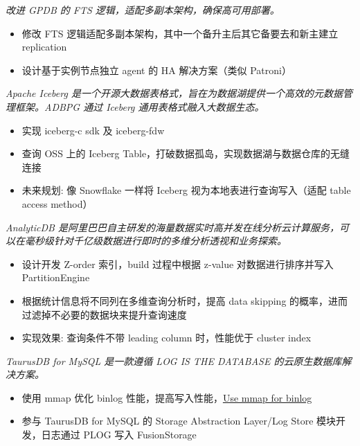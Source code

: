 \documentclass{resume}
\begin{document}
\textit{改进 GPDB 的 FTS 逻辑，适配多副本架构，确保高可用部署。}
\begin{onehalfspacing}
\begin{itemize}
  \item 修改 FTS 逻辑适配多副本架构，其中一个备升主后其它备要去和新主建立 replication
  \item 设计基于实例节点独立 agent 的 HA 解决方案（类似 Patroni）
\end{itemize}
\end{onehalfspacing}

\textit{Apache Iceberg 是一个开源大数据表格式，旨在为数据湖提供一个高效的元数据管理框架。ADBPG 通过 Iceberg 通用表格式融入大数据生态。}
\begin{onehalfspacing}
\begin{itemize}
  \item 实现 iceberg-c sdk 及 iceberg-fdw
  \item 查询 OSS 上的 Iceberg Table，打破数据孤岛，实现数据湖与数据仓库的无缝连接
  \item 未来规划: 像 Snowflake 一样将 Iceberg 视为本地表进行查询写入（适配 table access method）
\end{itemize}
\end{onehalfspacing}

\textit{AnalyticDB 是阿里巴巴自主研发的海量数据实时高并发在线分析云计算服务，可以在毫秒级针对千亿级数据进行即时的多维分析透视和业务探索。}
\begin{onehalfspacing}
\begin{itemize}
  \item 设计开发 Z-order 索引，build 过程中根据 z-value 对数据进行排序并写入 PartitionEngine
  \item 根据统计信息将不同列在多维查询分析时，提高 data skipping 的概率，进而过滤掉不必要的数据块来提升查询速度
  \item 实现效果: 查询条件不带 leading column 时，性能优于 cluster index
\end{itemize}
\end{onehalfspacing}

\textit{TaurusDB for MySQL 是一款遵循 LOG IS THE DATABASE 的云原生数据库解决方案。}
\begin{onehalfspacing}
\begin{itemize}
  \item 使用 mmap 优化 binlog 性能，提高写入性能，\href{https://github.com/mysql/mysql-server/pull/314}{Use mmap for binlog}
  \item 参与 TaurusDB for MySQL 的 Storage Abstraction Layer/Log Store 模块开发，日志通过 PLOG 写入 FusionStorage
\end{itemize}
\end{onehalfspacing}
\end{document}

